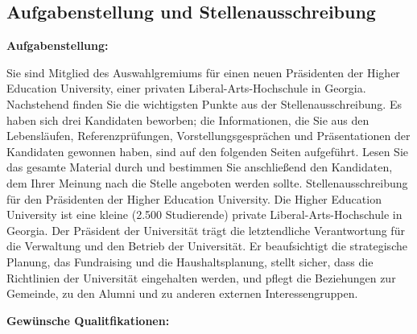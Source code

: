 \clearpage

\subsection*{Aufgabenstellung und Stellenausschreibung}
\pagestyle{empty}
\thispagestyle{empty}

\textbf{Aufgabenstellung:}

Sie sind Mitglied des Auswahlgremiums für einen neuen Präsidenten der Higher Education University, einer
privaten Liberal-Arts-Hochschule in Georgia. Nachstehend finden Sie die wichtigsten Punkte aus der
Stellenausschreibung. Es haben sich drei Kandidaten beworben; die Informationen, die Sie aus den
Lebensläufen, Referenzprüfungen, Vorstellungsgesprächen und Präsentationen der Kandidaten gewonnen haben,
sind auf den folgenden Seiten aufgeführt. Lesen Sie das gesamte Material durch und bestimmen Sie anschließend
den Kandidaten, dem Ihrer Meinung nach die Stelle angeboten werden sollte. Stellenausschreibung für den
Präsidenten der Higher Education University.
Die Higher Education University ist eine kleine (2.500 Studierende) private Liberal-Arts-Hochschule in
Georgia.
Der Präsident der Universität trägt die letztendliche Verantwortung für die Verwaltung und den
Betrieb der Universität. Er beaufsichtigt die strategische Planung, das Fundraising und die Haushaltsplanung,
stellt sicher, dass die Richtlinien der Universität eingehalten werden, und pflegt die Beziehungen zur
Gemeinde, zu den Alumni und zu anderen externen Interessengruppen.

\clearpage

\textbf{Gewünsche Qualitfikationen:}

